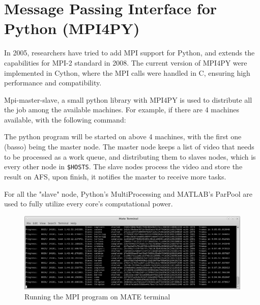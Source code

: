\documentclass[bsc,logo,twoside,fullspacing,parskip]{infthesis}
\begin{document}
\section{Message Passing Interface for Python (MPI4PY)}

In 2005, researchers have tried to add MPI support for Python\cite{MPI4PY}, and extends the capabilities for MPI-2 standard in 2008\cite{MPI4PY2}. The current version of MPI4PY\cite{MPI4PY3} were implemented in Cython, where the MPI calls were handled in C, ensuring high performance and compatibility.

Mpi-master-slave\cite{L5}, a small python library with MPI4PY is used to distribute all the job among the available machines. 
For example, if there are 4 machines available, with the following command: 

The python program will be started on above 4 machines, with the first one (basso) being the master node.
The master node keeps a list of video that needs to be processed as a work queue, and distributing them to slaves nodes, which is every other node in {\tt \$HOSTS}. 
The slave nodes process the video and store the result on AFS, upon finish, it notifies the master to receive more tasks.


For all the "slave" node, Python's MultiProcessing and MATLAB's ParPool are used to fully utilize every core's computational power.

\begin{figure}
    \centering
    \includegraphics[scale=0.30]{graph/sample_terminal.png}
    \caption{Running the MPI program on MATE terminal}
    \label{fig:mpi}
\end{figure}
\end{document}
